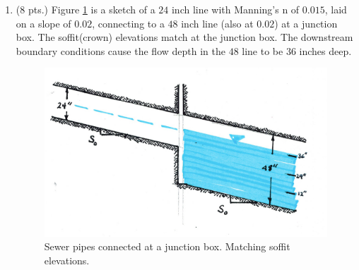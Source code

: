 \documentclass[11pt]{article}
\begin{document}
\begin{enumerate}
\clearpage
\item (8 pts.)
Figure \ref{fig:SewerPipeMatchSoffit} is a sketch of a $24$ inch line with Manning's n of $0.015$, laid on a slope of $0.02$, connecting to a $48$ inch line (also at $0.02$) at a junction box.   The soffit(crown) elevations match at the junction box.  The downstream boundary conditions cause the flow depth in the $48$ line to be $36$ inches deep.

\begin{figure}[h!] %
\centering
   \includegraphics[width=4.25in]{SewerPipeMatchSoffit.jpg}
   \caption{Sewer pipes connected at a junction box.  Matching soffit elevations.}
   \label{fig:SewerPipeMatchSoffit} 
\end{figure}


\end{enumerate}
\end{document}
